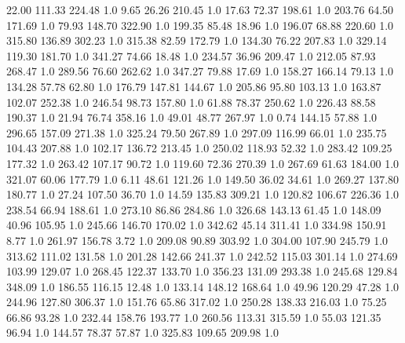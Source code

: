      22.00    111.33    224.48  1.0
      9.65     26.26    210.45  1.0
     17.63     72.37    198.61  1.0
    203.76     64.50    171.69  1.0
     79.93    148.70    322.90  1.0
    199.35     85.48     18.96  1.0
    196.07     68.88    220.60  1.0
    315.80    136.89    302.23  1.0
    315.38     82.59    172.79  1.0
    134.30     76.22    207.83  1.0
    329.14    119.30    181.70  1.0
    341.27     74.66     18.48  1.0
    234.57     36.96    209.47  1.0
    212.05     87.93    268.47  1.0
    289.56     76.60    262.62  1.0
    347.27     79.88     17.69  1.0
    158.27    166.14     79.13  1.0
    134.28     57.78     62.80  1.0
    176.79    147.81    144.67  1.0
    205.86     95.80    103.13  1.0
    163.87    102.07    252.38  1.0
    246.54     98.73    157.80  1.0
     61.88     78.37    250.62  1.0
    226.43     88.58    190.37  1.0
     21.94     76.74    358.16  1.0
     49.01     48.77    267.97  1.0
      0.74    144.15     57.88  1.0
    296.65    157.09    271.38  1.0
    325.24     79.50    267.89  1.0
    297.09    116.99     66.01  1.0
    235.75    104.43    207.88  1.0
    102.17    136.72    213.45  1.0
    250.02    118.93     52.32  1.0
    283.42    109.25    177.32  1.0
    263.42    107.17     90.72  1.0
    119.60     72.36    270.39  1.0
    267.69     61.63    184.00  1.0
    321.07     60.06    177.79  1.0
      6.11     48.61    121.26  1.0
    149.50     36.02     34.61  1.0
    269.27    137.80    180.77  1.0
     27.24    107.50     36.70  1.0
     14.59    135.83    309.21  1.0
    120.82    106.67    226.36  1.0
    238.54     66.94    188.61  1.0
    273.10     86.86    284.86  1.0
    326.68    143.13     61.45  1.0
    148.09     40.96    105.95  1.0
    245.66    146.70    170.02  1.0
    342.62     45.14    311.41  1.0
    334.98    150.91      8.77  1.0
    261.97    156.78      3.72  1.0
    209.08     90.89    303.92  1.0
    304.00    107.90    245.79  1.0
    313.62    111.02    131.58  1.0
    201.28    142.66    241.37  1.0
    242.52    115.03    301.14  1.0
    274.69    103.99    129.07  1.0
    268.45    122.37    133.70  1.0
    356.23    131.09    293.38  1.0
    245.68    129.84    348.09  1.0
    186.55    116.15     12.48  1.0
    133.14    148.12    168.64  1.0
     49.96    120.29     47.28  1.0
    244.96    127.80    306.37  1.0
    151.76     65.86    317.02  1.0
    250.28    138.33    216.03  1.0
     75.25     66.86     93.28  1.0
    232.44    158.76    193.77  1.0
    260.56    113.31    315.59  1.0
     55.03    121.35     96.94  1.0
    144.57     78.37     57.87  1.0
    325.83    109.65    209.98  1.0
